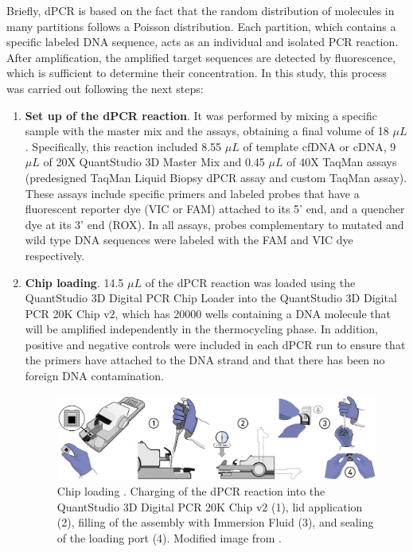Briefly, dPCR is based on the fact that the random distribution of molecules in many partitions follows a Poisson distribution. Each partition, which contains a specific labeled DNA sequence, acts as an individual and isolated PCR reaction. After amplification, the amplified target sequences are detected by fluorescence, which is sufficient to determine their concentration. In this study, this process was carried out following the next steps:
\begin{enumerate}[font=\bfseries]
    \item \textbf{Set up of the dPCR reaction}. It was performed by mixing a specific sample with the master mix and the assays, obtaining a final volume of 18 $\mu L$. Specifically, this reaction included 8.55 $\mu L$ of template cfDNA or cDNA, 9 $\mu L$ of 20X QuantStudio\texttrademark{} 3D Master Mix and 0.45 $\mu L$ of 40X TaqMan\texttrademark{} assays (predesigned TaqMan\texttrademark{} Liquid Biopsy dPCR assay and custom TaqMan\texttrademark{} assay). These assays include specific primers and labeled probes that have a fluorescent reporter dye (VIC\texttrademark{} or FAM\texttrademark{}) attached to its 5' end, and a quencher dye at its 3' end (ROX\texttrademark{}). In all assays, probes complementary to mutated and wild type DNA sequences were labeled with the FAM\texttrademark{} and VIC\texttrademark{} dye respectively.
    \item \textbf{Chip loading}. 14.5 $\mu L$ of the dPCR reaction was loaded using the QuantStudio\texttrademark{} 3D Digital PCR Chip Loader into the QuantStudio\texttrademark{} 3D Digital PCR 20K Chip v2, which has 20000 wells containing a DNA molecule that will be amplified independently in the thermocycling phase. In addition, positive and negative controls were included in each dPCR run to ensure that the primers have attached to the DNA strand and that there has been no foreign DNA contamination.
    \begin{figure}[t]
        \centering
        \includegraphics[width=\textwidth]{Images/chapter_3/chip_loading.png}
        \caption{ Chip loading \cite{dPCR_QuantStudio}. Charging of the dPCR reaction into the QuantStudio\texttrademark{} 3D Digital PCR 20K Chip v2 (1), lid application (2), filling of the assembly with Immersion Fluid (3), and sealing of the loading port (4). Modified image from \cite{dPCR_QuantStudio}.}

\end{figure}
\end{enumerate}
